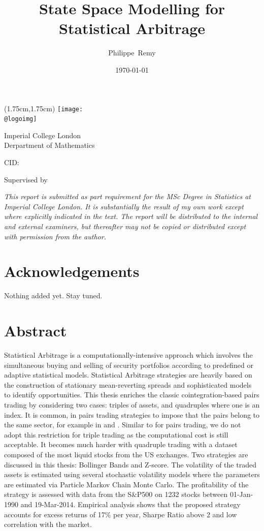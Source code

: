 \documentclass[11pt,a4,twosided,singlespacing,titlepagenumber=on]{scrreprt}
\title{State Space Modelling for Statistical Arbitrage}
\author{Philippe~Remy}
\date{\today}
\makeatletter
\numberwithin{equation}{chapter} %
\theoremstyle{remark}
\renewcommand{\maketitle}{
\begin{titlepage}
\ifdefined\@logoimg
\begin{textblock*}{8cm}(1.75cm,1.75cm)
\texttt{[image: \\@logoimg]}
\end{textblock*}
\vspace*{1cm}
\else
\fi
\begin{center}
\vspace*{\stretch{0.1}}
Imperial College London\\
Derpartment of Mathematics\par
\vspace*{\stretch{1}} %
{\titlefont\Huge \@title\par} %
\vspace*{\stretch{2}}
{\Large \@author \par}
\vspace*{1em}
{\large CID: \@CID \par}
\vspace*{\stretch{0.5}}
{\large Supervised by \@supervisor \par}
\vspace*{\stretch{3}}
{\Large \@date \par}
\vspace*{\stretch{1}}

\textit{This report is submitted as part requirement for the MSc Degree in Statistics at Imperial College London. It is substantially the result of my own work except where explicitly indicated in the text.
The report will be distributed to the internal and external examiners, but thereafter may not be
copied or distributed except with permission from the author.}
\vspace*{\stretch{0.1}}
\end{center}%
\end{titlepage}%
}
\renewenvironment{abstract}%
{\chapter*{Abstract}\thispagestyle{plain}}%
{\clearpage}
\makeatother
\begin{document}


\maketitle

\renewcommand{\contentsname}{Table of Contents}
\tableofcontents

\listoffigures
\listoftables


\chapter*{Acknowledgements}
Nothing added yet. Stay tuned.

\begin{abstract}
Statistical Arbitrage is a computationally-intensive approach which involves the simultaneous buying and selling of security portfolios according to predefined or adaptive statistical models. Statistical Arbitrage strategies are heavily based on the construction of stationary mean-reverting spreads and sophisticated models to identify opportunities. This thesis enriches the classic cointegration-based pairs trading by considering two cases: triples of assets, and quadruples where one is an index. It is common, in pairs trading strategies to impose that the pairs belong to the same sector, for example in \cite{chan2009} and \cite{dunis2010}. Similar to \cite{caldeira2013} for pairs trading, we do not adopt this restriction for triple trading as the computational cost is still acceptable. It becomes much harder with quadruple trading with a dataset composed of the most liquid stocks from the US exchanges. Two strategies are discussed in this thesis: Bollinger Bands and Z-score. The volatility of the traded assets is estimated using several stochastic volatility models where the parameters are estimated via Particle Markov Chain Monte Carlo. The profitability of the strategy is assessed with data from the S\&P500 on 1232 stocks between 01-Jan-1990 and 19-Mar-2014. Empirical analysis shows that the proposed strategy accounts for excess returns of 17\% per year, Sharpe Ratio above 2 and low correlation with the market.

\end{abstract}
\newpage



\end{document}
